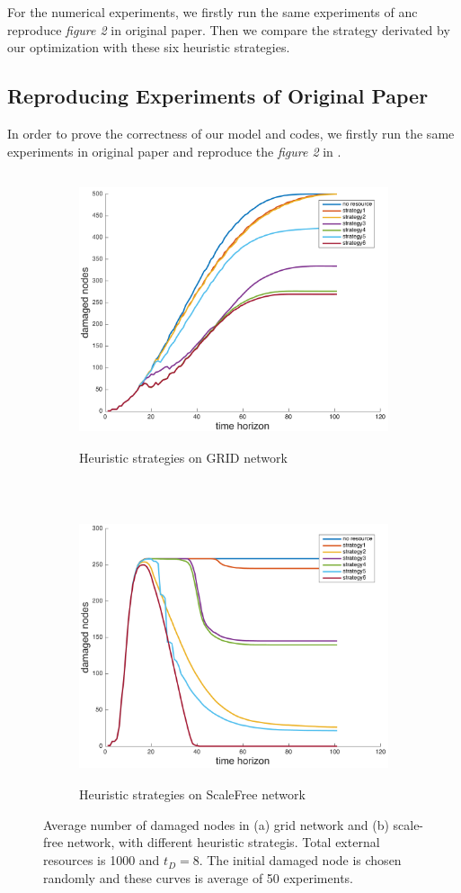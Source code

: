For the numerical experiments, we firstly run the same experiments of \cite{buzna2007efficient} anc reproduce \emph{figure 2} in original paper\cite{buzna2007efficient}. Then we compare the strategy derivated by our optimization with these six heuristic strategies.

\subsection{Reproducing Experiments of Original Paper}

In order to prove the correctness of our model and codes, we firstly run the same experiments in original paper\cite{buzna2007efficient} and reproduce the \emph{figure 2} in \cite{buzna2007efficient}.


\begin{figure}	
	\centering
	\begin{subfigure}[t]{0.8\textwidth}
		\centering
		\includegraphics[height=80mm]{../figs/GridNet_original_paper2.pdf}
		\caption{Heuristic strategies on GRID network}
	\end{subfigure}
	~
	\begin{subfigure}[t]{0.8\textwidth}
		\centering
		\includegraphics[height=80mm]{../figs/SFNet_original_paper2.pdf}
		\caption{Heuristic strategies on ScaleFree network}
	\end{subfigure}
	\caption{Average number of damaged nodes in (a) grid network and (b) scale-free network, with different heuristic strategis. Total external resources is 1000 and $t_D=8$. The initial damaged node is chosen randomly and these curves is average of 50 experiments.}
	\label{fig:reproduceresult}
\end{figure}
